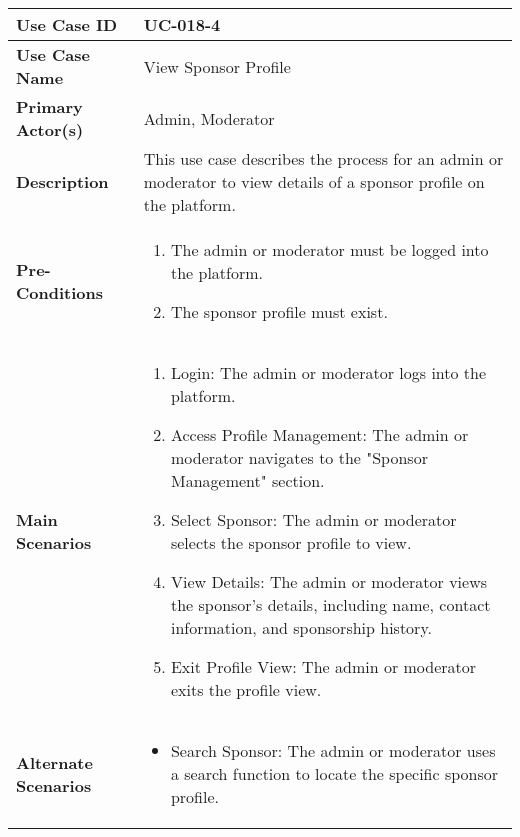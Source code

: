 \begin{table}[!ht]
    \centering
    \renewcommand{\arraystretch}{1.3} %
    \begin{tabularx}{\textwidth}{|l|X|}
        \hline
        \textbf{Use Case ID} & UC-018-4 \\
        \hline
        \textbf{Use Case Name} & View Sponsor Profile \\
        \hline
        \textbf{Primary Actor(s)} & Admin, Moderator \\
        \hline
        \textbf{Description} & This use case describes the process for an admin or moderator to view details of a sponsor profile on the platform. \\
        \hline
        \textbf{Pre-Conditions} & 
        \begin{enumerate}[label=\arabic*.,itemsep=0pt]
            \item The admin or moderator must be logged into the platform.
            \item The sponsor profile must exist.
        \end{enumerate} \\
        \hline
        \textbf{Main Scenarios} & 
        \begin{enumerate}[label=\arabic*.,itemsep=0pt]
            \item Login: The admin or moderator logs into the platform.
            \item Access Profile Management: The admin or moderator navigates to the "Sponsor Management" section.
            \item Select Sponsor: The admin or moderator selects the sponsor profile to view.
            \item View Details: The admin or moderator views the sponsor's details, including name, contact information, and sponsorship history.
            \item Exit Profile View: The admin or moderator exits the profile view.
        \end{enumerate} \\
        \hline
        \textbf{Alternate Scenarios} & 
        \begin{itemize}[label=--,itemsep=0pt]
            \item Search Sponsor: The admin or moderator uses a search function to locate the specific sponsor profile.
        \end{itemize} \\
        \hline

\end{tabularx}
\end{table}
